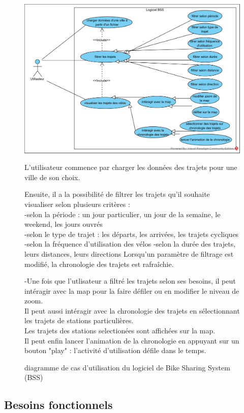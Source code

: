 \documentclass[12pt]{article}
\begin{document}
		\begin{figure}[!ht]
		\includegraphics[scale=1]{Use_case_1.png}
		\caption{diagramme de cas d'utilisation du logiciel de Bike Sharing System (BSS)}
		\medskip
		L'utilisateur commence par charger les données des trajets pour une ville de son choix.\par

		Ensuite, il a la possibilité de filtrer les trajets qu'il souhaite visualiser selon plusieurs critères :\\
			-selon la période : un jour particulier, un jour de la semaine, le weekend, les jours ouvrés\\
			-selon le type de trajet : les départs, les arrivées, les trajets cycliques
			-selon la fréquence d'utilisation des vélos
			-selon la durée des trajets, leurs distances, leurs directions
		Lorsqu'un paramètre de filtrage est modifié, la chronologie des trajets est rafraîchie.\par

		-Une fois que l'utlisateur a filtré les trajets selon ses besoins, il peut intéragir avec la map pour la faire défiler ou en modifier le niveau de zoom.\\
		Il peut aussi intéragir avec la chronologie des trajets en sélectionnant les trajets de stations particulières.\\
		Les trajets des stations selectionées sont affichées sur la map.\\
		Il peut enfin lancer l'animation de la chronologie en appuyant sur un bouton "play" : l'activité d'utilisation défile dans le temps.
		\end{figure}
		\newpage

		\subsection{Besoins fonctionnels}
\end{document}
